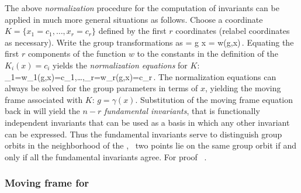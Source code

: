The above \emph{normalization} procedure for the computation of
invariants can be applied in much more general situations as follows. 
Choose a coordinate {\csection} $K=\{x_1=c_1,\ldots,x_r=c_r\}$ defined by the first $r$
coordinates (relabel coordinates as necessary). 
Write the group transformations as
\beq
	= g \cdot x = w(g,x)\,.
	\label{eq:transNorm}
\eeq
Equating the first $r$ components of the function $w$ to the
constants in the definition of the {\csection} $K_i(x)=c_i$
yields the \emph{normalization equations} for $K$:
\beq
	_1=w_1(g,x)=c_1,\ldots,_r=w_r(g,x)=c_r\,.
	\label{eq:normalization}
\eeq
The normalization equations 
can always be solved for the group parameters in terms of
$x$, yielding the moving frame associated with $K$:
$g=\gamma(x)$. Substitution of the moving frame equation back
in  will yield the $n-r$
\emph{fundamental invariants}, that is functionally independent
invariants that can be used as a basis in which any other invariant
can be expressed. Thus the fundamental invariants serve to distinguish
group orbits in the neighborhood of the {\csection}, \ie~two points
lie on the same group orbit if and only if all the
fundamental invariants agree. For proof
\cf~.

\subsubsection{Moving frame for \CLe}
\label{sec:CLeMF}


